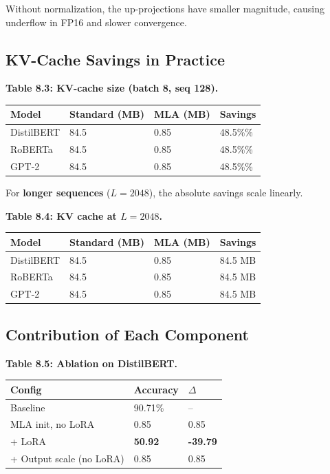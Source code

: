 Without normalization, the up-projections have smaller magnitude, causing 
underflow in FP16 and slower convergence.

\subsection{KV-Cache Savings in Practice}

\textbf{Table 8.3: KV-cache size (batch 8, seq 128).}

\begin{table}[H]
\centering
\small
\begin{tabular}{llll}
\toprule
\textbf{Model} & \textbf{Standard (MB)} & \textbf{MLA (MB)} & \textbf{Savings} \\
\midrule
DistilBERT & 84.5 & 0.85 & 48.5\%\% \\
RoBERTa & 84.5 & 0.85 & 48.5\%\% \\
GPT-2 & 84.5 & 0.85 & 48.5\%\% \\
\bottomrule
\end{tabular}
\end{table}

For \textbf{longer sequences} ($L = 2048$), the absolute savings scale linearly.

\textbf{Table 8.4: KV cache at $L = 2048$.}

\begin{table}[H]
\centering
\small
\begin{tabular}{llll}
\toprule
\textbf{Model} & \textbf{Standard (MB)} & \textbf{MLA (MB)} & \textbf{Savings} \\
\midrule
DistilBERT & 84.5 & 0.85 & 84.5 MB \\
RoBERTa & 84.5 & 0.85 & 84.5 MB \\
GPT-2 & 84.5 & 0.85 & 84.5 MB \\
\bottomrule
\end{tabular}
\end{table}

\subsection{Contribution of Each Component}

\textbf{Table 8.5: Ablation on DistilBERT.}

\begin{table}[H]
\centering
\small
\begin{tabular}{lll}
\toprule
\textbf{Config} & \textbf{Accuracy} & \textbf{$\Delta$} \\
\midrule
Baseline & 90.71\% & -- \\
MLA init, no LoRA & 0.85 & 0.85 \\
+ LoRA & \textbf{50.92} & \textbf{-39.79} \\
+ Output scale (no LoRA) & 0.85 & 0.85 \\
\bottomrule
\end{tabular}
\end{table}

